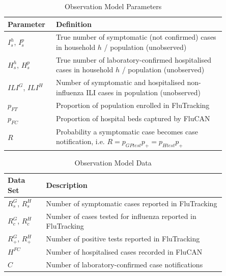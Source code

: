 \begin{table}[h!]
	\centering
	\caption{Observation Model Parameters}
	\begin{tabular}{p{0.15\linewidth}p{0.7\linewidth}}
		\toprule
		Parameter  & Definition \\
		\midrule
		$I_s^h$, $I_s^p$	 & True number of symptomatic (not confirmed) cases in household $h$ / population (unobserved) \\
		$H_s^h$, $H_s^p$   & True number of laboratory-confirmed hospitalised cases in household $h$ / population (unobserved) \\
		$ILI^{G}$, $ILI^{H}$  & Number of symptomatic and hospitalised non-influenza ILI cases in population (unobserved) \\
		$p_{FT}$                 & Proportion of population enrolled in FluTracking \\
		$p_{FC}$                 & Proportion of hospital beds captured by FluCAN \\
		$R$                        & Probability a symptomatic case becomes case notification, i.e. $R = p_{GPtest}p_{+} = p_{Htest}p_{+}$ \\
		\bottomrule
	\end{tabular}
	\label{tab: Observation states}
\end{table}

\begin{table}[h!]
	\centering
	\caption{Observation Model Data}
	\begin{tabular}{p{0.15\linewidth}p{0.7\linewidth}}
		\toprule
		Data Set      & Description \\
		\midrule
		$R_{s}^G$, $R_{s}^H$   & Number of symptomatic cases reported in FluTracking \\
		$R_{c}^G$, $R_{c}^H$       & Number of cases tested for influenza reported in FluTracking \\
		$R_{+}^G$, $R_{+}^H$	    & Number of positive tests reported in FluTracking  \\
		$H^{FC}$	                 & Number of hospitalised cases recorded in FluCAN \\
		$C$		                        & Number of laboratory-confirmed case notifications \\
		\bottomrule
	\end{tabular}
	\label{tab: Observation parameters}
\end{table}	




